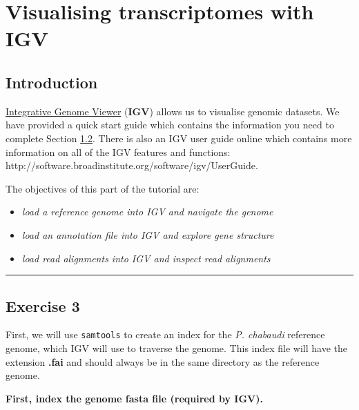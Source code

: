 \documentclass[11pt]{article}
\providecommand{\tightlist}{%
      \setlength{\itemsep}{0pt}\setlength{\parskip}{0pt}}
\begin{document}
\newpage





    \hypertarget{visualising-transcriptomes-with-igv}{%
\section{Visualising transcriptomes with
IGV}\label{visualising-transcriptomes-with-igv}}

    \hypertarget{introduction}{%
\subsection{Introduction}\label{introduction}}

\href{https://software.broadinstitute.org/software/igv/}{Integrative
Genome Viewer} (\textbf{IGV}) allows us to visualise genomic datasets.
We have provided a quick start guide which contains the information you
need to complete Section \ref{exercise-3}. There is also an IGV user
guide online which contains more information on all of the IGV features
and functions:
http://software.broadinstitute.org/software/igv/UserGuide.

The objectives of this part of the tutorial are:

\begin{itemize}
\tightlist
\item
  \textit{load a reference genome into IGV and navigate the genome}
\item
  \textit{load an annotation file into IGV and explore gene structure}
\item
  \textit{load read alignments into IGV and inspect read alignments}
\end{itemize}

    \begin{center}\rule{0.5\linewidth}{.4pt}\end{center}

    \hypertarget{exercise-3}{%
\subsection{Exercise 3}\label{exercise-3}}

First, we will use \texttt{samtools} to create an index for the \textit{P.
chabaudi} reference genome, which IGV will use to traverse the genome.
This index file will have the extension \textbf{.fai} and should always
be in the same directory as the reference genome.

    \textbf{First, index the genome fasta file (required by IGV).}
\end{document}
